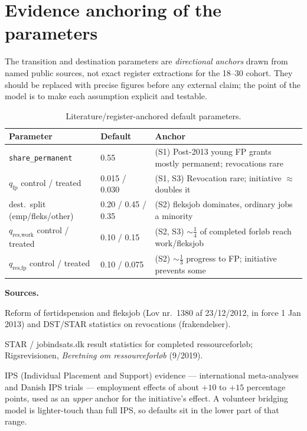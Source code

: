 \documentclass[11pt,a4paper]{article}
\begin{document}
\section{Evidence anchoring of the parameters}
The transition and destination parameters are \emph{directional anchors} drawn
from named public sources, not exact register extractions for the 18--30
cohort. They should be replaced with precise figures before any external claim;
the point of the model is to make each assumption explicit and testable.

\begin{table}[H]
\centering
\caption{Literature/register-anchored default parameters.}
\label{tab:params}
\small
\begin{tabular}{@{}llp{7.4cm}@{}}
\toprule
Parameter & Default & Anchor \\
\midrule
\texttt{share\_permanent} & 0.55 & (S1) Post-2013 young FP grants mostly permanent; revocations rare \\
$q_{\text{fp}}$ control / treated & 0.015 / 0.030 & (S1, S3) Revocation rare; initiative $\approx$ doubles it \\
dest.\ split (emp/fleks/other) & 0.20 / 0.45 / 0.35 & (S2) fleksjob dominates, ordinary jobs a minority \\
$q_{\text{res,work}}$ control / treated & 0.10 / 0.15 & (S2, S3) $\sim\tfrac14$ of completed forl\o b reach work/fleksjob \\
$q_{\text{res,fp}}$ control / treated & 0.10 / 0.075 & (S2) $\sim\tfrac13$ progress to FP; initiative prevents some \\
\bottomrule
\end{tabular}
\end{table}

\noindent\textbf{Sources.}
\begin{description}[nosep,leftmargin=2.6em,style=nextline]
  \item[(S1)] Reform of f\o rtidspension and fleksjob (Lov nr.\ 1380 af
    23/12/2012, in force 1 Jan 2013) and DST/STAR statistics on revocations
    (frakendelser).
  \item[(S2)] STAR / jobindsats.dk result statistics for completed
    ressourceforl\o b; Rigsrevisionen, \emph{Beretning om ressourceforl\o b}
    (9/2019).
  \item[(S3)] IPS (Individual Placement and Support) evidence --- international
    meta-analyses and Danish IPS trials --- employment effects of about
    $+10$ to $+15$ percentage points, used as an \emph{upper} anchor for the
    initiative's effect. A volunteer bridging model is lighter-touch than full
    IPS, so defaults sit in the lower part of that range.
\end{description}
\end{document}
